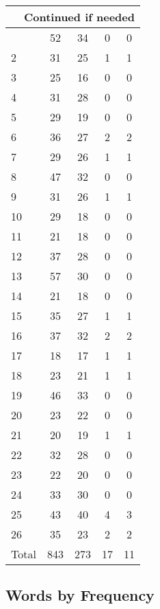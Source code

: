 \begin{center}
\begin{longtable}{l|c|c|c|c}
\hline \multicolumn{5}{|r|}{{Continued if needed}} \\ \hline
\endfoot 
1 & 52 & 34 & 0 & 0\\ \hline
2 & 31 & 25 & 1 & 1\\ \hline
3 & 25 & 16 & 0 & 0\\ \hline
4 & 31 & 28 & 0 & 0\\ \hline
5 & 29 & 19 & 0 & 0\\ \hline
6 & 36 & 27 & 2 & 2\\ \hline
7 & 29 & 26 & 1 & 1\\ \hline
8 & 47 & 32 & 0 & 0\\ \hline
9 & 31 & 26 & 1 & 1\\ \hline
10 & 29 & 18 & 0 & 0\\ \hline
11 & 21 & 18 & 0 & 0\\ \hline
12 & 37 & 28 & 0 & 0\\ \hline
13 & 57 & 30 & 0 & 0\\ \hline
14 & 21 & 18 & 0 & 0\\ \hline
15 & 35 & 27 & 1 & 1\\ \hline
16 & 37 & 32 & 2 & 2\\ \hline
17 & 18 & 17 & 1 & 1\\ \hline
18 & 23 & 21 & 1 & 1\\ \hline
19 & 46 & 33 & 0 & 0\\ \hline
20 & 23 & 22 & 0 & 0\\ \hline
21 & 20 & 19 & 1 & 1\\ \hline
22 & 32 & 28 & 0 & 0\\ \hline
23 & 22 & 20 & 0 & 0\\ \hline
24 & 33 & 30 & 0 & 0\\ \hline
25 & 43 & 40 & 4 & 3\\ \hline
26 & 35 & 23 & 2 & 2\\ \hline
\hline \hline
Total & 843 & 273 & 17 & 11



\end{longtable}
\end{center}

 
\subsection{Words by Frequency}

